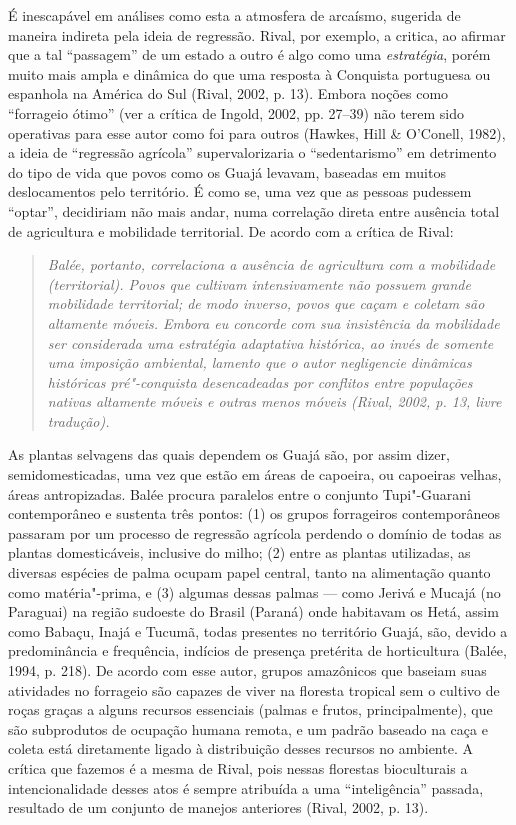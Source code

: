 É inescapável em análises como esta a atmosfera de arcaísmo, sugerida de
maneira indireta pela ideia de regressão. Rival, por exemplo, a critica,
ao afirmar que a tal ``passagem'' de um estado a outro é algo como uma
\emph{estratégia}, porém muito mais ampla e dinâmica do que uma resposta
à Conquista portuguesa ou espanhola na América do Sul (Rival, 2002, p. 13).
Embora noções como ``forrageio ótimo'' (ver a crítica de Ingold, 2002,
pp. 27--39) não terem sido operativas para esse autor como foi para outros
(Hawkes, Hill \& O'Conell, 1982), a ideia de ``regressão agrícola''
supervalorizaria o ``sedentarismo'' em detrimento do tipo de vida que
povos como os Guajá levavam, baseadas em muitos deslocamentos pelo
território. É como se, uma vez que as pessoas pudessem ``optar'',
decidiriam não mais andar, numa correlação direta entre ausência total
de agricultura e mobilidade territorial. De acordo com a crítica de
Rival:

\begin{quote}
\emph{Balée, portanto, correlaciona a ausência de agricultura com a
mobilidade (territorial). Povos que cultivam intensivamente não possuem
grande mobilidade territorial; de modo inverso, povos que caçam e
coletam são altamente móveis. Embora eu concorde com sua insistência da
mobilidade ser considerada uma estratégia adaptativa histórica, ao invés
de somente uma imposição ambiental, lamento que o autor negligencie
dinâmicas históricas pré"-conquista desencadeadas por conflitos entre
populações nativas altamente móveis e outras menos móveis (Rival, 2002, p.
13, livre tradução).}
\end{quote}

As plantas selvagens das quais dependem os Guajá são, por assim dizer,
semidomesticadas, uma vez que estão em áreas de capoeira, ou capoeiras
velhas, áreas antropizadas. Balée procura paralelos entre o conjunto
Tupi"-Guarani contemporâneo e sustenta três pontos: (1) os grupos 
forrageiros contemporâneos passaram por um processo de regressão
agrícola perdendo o domínio de todas as plantas domesticáveis, inclusive
do milho; (2) entre as plantas utilizadas, as diversas espécies de palma
ocupam papel central, tanto na alimentação quanto como matéria"-prima, e
(3) algumas dessas palmas --- como Jerivá e Mucajá (no Paraguai) na região
sudoeste do Brasil (Paraná) onde habitavam os Hetá, assim como Babaçu,
Inajá e Tucumã, todas presentes no território Guajá, são, devido a
predominância e frequência, indícios de presença pretérita de
horticultura (Balée, 1994, p. 218). De acordo com esse autor, grupos
amazônicos que baseiam suas atividades no forrageio são capazes de viver
na floresta tropical sem o cultivo de roças graças a alguns recursos
essenciais (palmas e frutos, principalmente), que são subprodutos de
ocupação humana remota, e um padrão baseado na caça e coleta está
diretamente ligado à distribuição desses recursos no ambiente. A crítica
que fazemos é a mesma de Rival, pois nessas florestas bioculturais a
intencionalidade desses atos é sempre atribuída a uma ``inteligência''
passada, resultado de um conjunto de manejos anteriores (Rival, 2002, p.
13).

